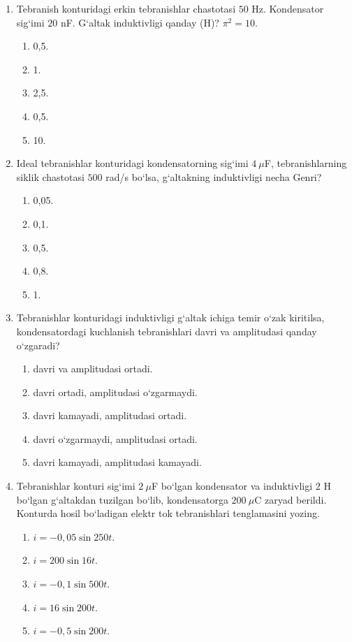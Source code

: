 \begin{enumerate}
\item Tebranish konturidagi erkin tebranishlar chastotasi $50$ Hz. Kondensator sig‘imi $20$ nF. G‘altak induktivligi qanday (H)? $\pi^2=10$.
\begin{enumerate}[label=\Alph*)]
\item 0,5.
\item 1.
\item 2,5.
\item 0,5.
\item 10.
\end{enumerate}

\item Ideal tebranishlar konturidagi kondensatorning sig‘imi $4~\mu$F, tebranishlarning siklik chastotasi $500$ rad/s bo‘lsa, g‘altakning induktivligi necha Genri?
\begin{enumerate}[label=\Alph*)]
\item 0,05.
\item 0,1.
\item 0,5.
\item 0,8.
\item 1.
\end{enumerate}

\item Tebranishlar konturidagi induktivligi g‘altak ichiga temir o‘zak kiritilsa, kondensatordagi kuchlanish tebranishlari davri va amplitudasi qanday o‘zgaradi?
\begin{enumerate}[label=\Alph*)]
\item davri va amplitudasi ortadi.
\item davri ortadi, amplitudasi o‘zgarmaydi.
\item davri kamayadi, amplitudasi ortadi.
\item davri o‘zgarmaydi, amplitudasi ortadi.
\item davri kamayadi, amplitudasi kamayadi.
\end{enumerate}

\item Tebranishlar konturi sig‘imi $2~\mu$F bo‘lgan kondensator va induktivligi $2$ H bo‘lgan g‘altakdan tuzilgan bo‘lib, kondensatorga $200~\mu$C zaryad berildi. Konturda hosil bo‘ladigan elektr tok tebranishlari tenglamasini yozing.
\begin{enumerate}[label=\Alph*)]
\item $i=-0,05\sin250t$.
\item $i=200\sin16t$.
\item $i=-0,1\sin500t$.
\item $i=16\sin200t$.
\item $i=-0,5\sin200t$.
\end{enumerate}


\end{enumerate}
